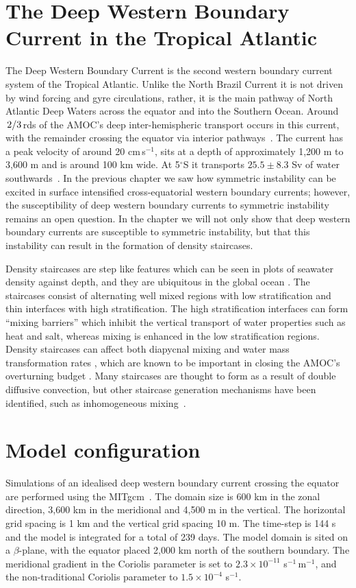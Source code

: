 \section{The Deep Western Boundary Current in the Tropical Atlantic}
The Deep Western Boundary Current is the second western boundary current system of the Tropical Atlantic. Unlike the North Brazil Current it is not driven by wind forcing and gyre circulations, rather, it is the main pathway of North Atlantic Deep Waters across the equator and into the Southern Ocean. Around $\flatfrac{2}{3}$rds of the AMOC's deep inter-hemispheric transport occurs in this current, with the remainder crossing the equator via interior pathways~\citep{Bower2019}. The current has a peak velocity of around 20 cm\,s$^{-1}$, sits at a depth of approximately 1,200 m to 3,600 m and is around 100 km wide. At 5$^\circ$S it transports $25.5\pm8.3$ Sv of water southwards~\citep{Schott2005}. In the previous chapter we saw how symmetric instability can be excited in surface intensified cross-equatorial western boundary currents; however, the susceptibility of deep western boundary currents to symmetric instability remains an open question. In the chapter we will not only show that deep western boundary currents are susceptible to symmetric instability, but that this instability can result in the formation of density staircases.

Density staircases are step like features which can be seen in plots of seawater density against depth, and they are ubiquitous in the global ocean \cite{Stern1960,Schmitt1987,Melling1984,Tait1968,Johannessen1974,Lambert1977}. The staircases consist of alternating well mixed regions with low stratification and thin interfaces with high stratification. The high stratification interfaces can form ``mixing barriers'' which inhibit the vertical transport of water properties such as heat and salt, whereas mixing is enhanced in the low stratification regions. Density staircases can affect both diapycnal mixing and water mass transformation rates \cite{Schmitt2005}, which are known to be important in closing the AMOC's overturning budget \cite{DeLavergne2022}. Many staircases are thought to form as a result of double diffusive convection, but other staircase generation mechanisms have been identified, such as inhomogeneous mixing~\cite{Balmforth1998}.



\section{Model configuration}
\label{sec:methods}
Simulations of an idealised deep western boundary current crossing the equator are performed using the MITgcm~\citep{Marshall1997}. The domain size is 600 km in the zonal direction, 3,600 km in the meridional and 4,500 m in the vertical. The horizontal grid spacing is 1 km and the vertical grid spacing 10 m. The time-step is 144 s and the model is integrated for a total of 239 days. The model domain is sited on a $\beta$-plane, with the equator placed 2,000 km north of the southern boundary. The meridional gradient in the Coriolis parameter is set to $2.3 \times 10^{-11}$ s$^{-1}\,$m$^{-1}$, and the non-traditional Coriolis parameter to $1.5 \times 10^{-4}$ s$^{-1}$.

